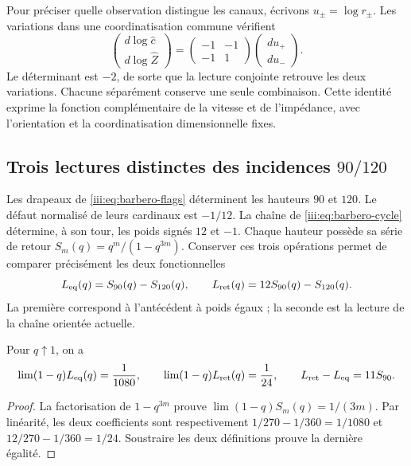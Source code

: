 Pour préciser quelle observation distingue les canaux, écrivons
$u_\pm=\log r_\pm$. Les variations dans une coordinatisation commune vérifient
\begin{equation}
 \begin{pmatrix}d\log\widehat c\\d\log\widehat Z\end{pmatrix}
 =\begin{pmatrix}-1&-1\\-1&1\end{pmatrix}
 \begin{pmatrix}du_+\\du_-\end{pmatrix}.
 \label{iii:eq:rec27-variaciones}
\end{equation}
Le déterminant est $-2$, de sorte que la lecture conjointe retrouve
les deux variations. Chacune séparément conserve une seule combinaison.
Cette identité exprime la fonction complémentaire de la vitesse et de
l’impédance, avec l’orientation et la coordinatisation dimensionnelle fixes.

\subsection{Trois lectures distinctes des incidences $90/120$}

Les drapeaux de \eqref{iii:eq:barbero-flags} déterminent les hauteurs
$90$ et $120$. Le défaut normalisé de leurs cardinaux est $-1/12$.
La chaîne de \eqref{iii:eq:barbero-cycle} détermine, à son tour,
les poids signés $12$ et $-1$. Chaque hauteur possède sa série de retour
$S_m(q)=q^m/(1-q^{3m})$. Conserver ces trois opérations permet de
comparer précisément les deux fonctionnelles
\begin{equation}
 L_{\rm eq}(q)=S_{90}(q)-S_{120}(q),\qquad
 L_{\rm ret}(q)=12S_{90}(q)-S_{120}(q).
 \label{iii:eq:rec27-dos-kernels}
\end{equation}
La première correspond à l’antécédent à poids égaux ; la seconde est
la lecture de la chaîne orientée actuelle.

\begin{proposition}
Pour $q\uparrow1$, on a
\begin{equation}
 \lim(1-q)L_{\rm eq}(q)=\frac1{1080},\qquad
 \lim(1-q)L_{\rm ret}(q)=\frac1{24},\qquad
 L_{\rm ret}-L_{\rm eq}=11S_{90}.
 \label{iii:eq:rec27-polos}
\end{equation}
\end{proposition}
\begin{proof}
La factorisation de $1-q^{3m}$ prouve
$\lim(1-q)S_m(q)=1/(3m)$.
Par linéarité, les deux coefficients sont respectivement
$1/270-1/360=1/1080$ et $12/270-1/360=1/24$.
Soustraire les deux définitions prouve la dernière égalité.
\end{proof}

